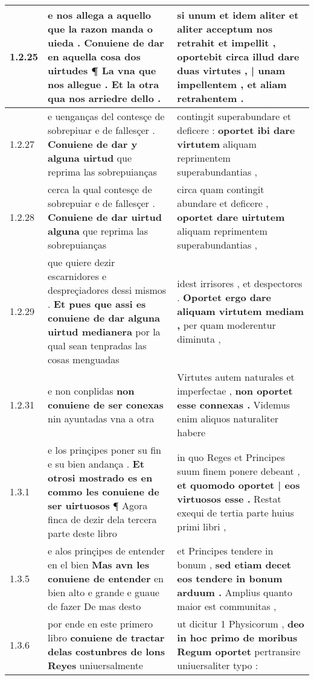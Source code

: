 \begin{tabular}{|p{1cm}|p{6.5cm}|p{6.5cm}|}
1.2.25 & e nos allega a aquello que la razon manda o uieda . \textbf{ Conuiene de dar en aquella cosa dos uirtudes ¶ La vna que nos allegue . } Et la otra qua nos arriedre dello . & si unum et idem aliter et aliter acceptum nos retrahit et impellit , \textbf{ oportebit circa illud dare duas virtutes , | unam impellentem , } et aliam retrahentem . \\\hline
1.2.27 & e uenganças del contesçe de sobrepiuar e de fallesçer . \textbf{ Conuiene de dar y alguna uirtud } que reprima las sobrepuianças & contingit superabundare et deficere : \textbf{ oportet ibi dare virtutem } aliquam reprimentem superabundantias , \\\hline
1.2.28 & cerca la qual contesçe de sobrepuiar e de fallesçer . \textbf{ Conuiene de dar uirtud alguna } que reprima las sobrepuianças & circa quam contingit abundare et deficere , \textbf{ oportet dare uirtutem } aliquam reprimentem superabundantias , \\\hline
1.2.29 & que quiere dezir escarnidores e despreçiadores dessi mismos . \textbf{ Et pues que assi es conuiene de dar alguna uirtud medianera } por la qual sean tenpradas las cosas menguadas & idest irrisores , et despectores . \textbf{ Oportet ergo dare aliquam virtutem mediam , } per quam moderentur diminuta , \\\hline
1.2.31 & e non conplidas \textbf{ non conuiene de ser conexas } nin ayuntadas vna a otra & Virtutes autem naturales et imperfectae , \textbf{ non oportet esse connexas . } Videmus enim aliquos naturaliter habere \\\hline
1.3.1 & e los prinçipes poner su fin e su bien andança . \textbf{ Et otrosi mostrado es en commo les conuiene de ser uirtuosos } ¶ Agora finca de dezir dela tercera parte deste libro & in quo Reges et Principes suum finem ponere debeant , \textbf{ et quomodo oportet | eos virtuosos esse . } Restat exequi de tertia parte huius primi libri , \\\hline
1.3.5 & e alos prinçipes de entender en el bien \textbf{ Mas avn les conuiene de entender } en bien alto e grande e guaue de fazer De mas desto & et Principes tendere in bonum , \textbf{ sed etiam decet eos tendere in bonum arduum . } Amplius quanto maior est communitas , \\\hline
1.3.6 & por ende en este primero libro \textbf{ conuiene de tractar delas costunbres de lons Reyes } uniuersalmente & ut dicitur 1 Physicorum , \textbf{ deo in hoc primo de moribus Regum oportet } pertransire uniuersaliter typo : \\\hline

\end{tabular}
